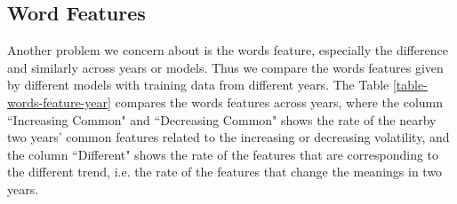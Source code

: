 \documentclass[11pt]{article}
\begin{document}
\subsection{Word Features}

Another problem we concern about is the words feature, especially the difference and similarly across years or models. Thus we compare the words features given by different models with training data from different years. The Table \ref{table-words-feature-year} compares the words features across years, where the column ``Increasing Common" and ``Decreasing Common" shows the rate of the nearby two years' common features related to the increasing or decreasing volatility, and the column ``Different" shows the rate of the features that are corresponding to the different trend, i.e. the rate of the features that change the meanings in two years.
\end{document}
